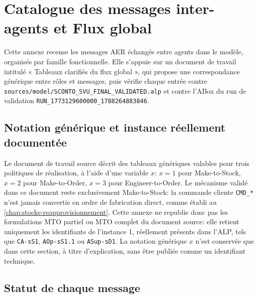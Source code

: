 \chapter{Catalogue des messages inter-agents et Flux global}
\label{ann:messages-flux-global}

Cette annexe recense les messages AER échangés entre agents dans le modèle, organisés par famille fonctionnelle. Elle s'appuie sur un document de travail intitulé « Tableaux clarifiés du flux global », qui propose une correspondance générique entre rôles et messages, puis vérifie chaque entrée contre \texttt{sources/model/SCONTO\_\allowbreak SVU\_\allowbreak FINAL\_\allowbreak VALIDATED.alp} et contre l'ABox du run de validation \texttt{RUN\_1773129600000\_1788264883846}.

\section{Notation générique et instance réellement documentée}

Le document de travail source décrit des tableaux génériques valables pour trois politiques de réalisation, à l'aide d'une variable $x$: $x=1$ pour Make-to-Stock, $x=2$ pour Make-to-Order, $x=3$ pour Engineer-to-Order. Le mécanisme validé dans ce document reste exclusivement Make-to-Stock: la commande cliente \texttt{CMD\_*} n'est jamais convertie en ordre de fabrication direct, comme établi au \cref{chap:stocks-reapprovisionnement}. Cette annexe ne republie donc pas les formulations MTO partiel ou MTO complet du document source: elle retient uniquement les identifiants de l'instance 1, réellement présents dans l'ALP, tels que \texttt{CA-s\allowbreak S1}, \texttt{AOp-s\allowbreak S1.1} ou \texttt{ASup-s\allowbreak D1}. La notation générique $x$ n'est conservée que dans cette section, à titre d'explication, sans être publiée comme un identifiant technique.


\section{Statut de chaque message}

